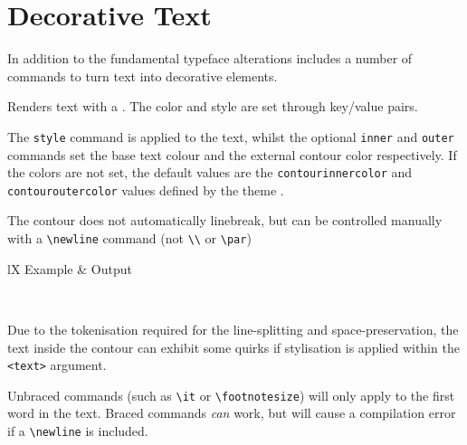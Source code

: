 	\section{Decorative Text}
		In addition to the fundamental typeface alterations \rpgtex{} includes a number of commands to turn text into decorative elements.
		\begin{macrolist}
				{	
					Renders text with a . The color and style are set through key/value pairs.
				}
				{
				}
				{
					The \texttt{style} command is applied to the text, whilst the optional \texttt{inner} and \texttt{outer} commands set the base text colour and the external contour color respectively. If the colors are not set, the default values are the \verb|contourinnercolor| and \verb|contouroutercolor| values defined by the theme .
					
					The contour does not automatically linebreak, but can be controlled manually with a \verb|\newline| command (not \verb|\\| or \texttt{\textbackslash{}par})
					
					\begin{RpgTable}{lX}
						Example & Output \\
					\end{RpgTable}					
					~

					Due to the tokenisation required for the line-splitting and space-preservation, the text inside the contour can exhibit some quirks if stylisation is applied within the \verb|<text>| argument. 

					Unbraced commands (such as \verb|\it| or \verb|\footnotesize|) will only apply to the first word in the text. Braced commands \textit{can} work, but will cause a compilation error if a \verb|\newline| is included. 

}
\end{macrolist}
